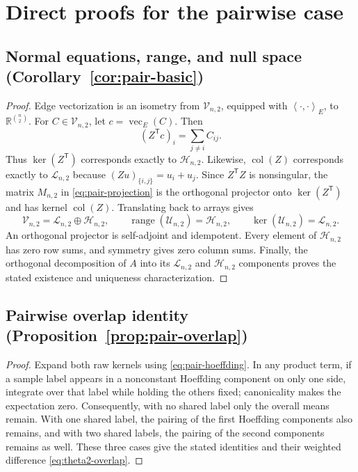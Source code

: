 \documentclass[11pt]{article}
\theoremstyle{plain}
\theoremstyle{definition}
\theoremstyle{remark}
\newcommand{\R}{\mathbb R}
\newcommand{\range}{\operatorname{range}}
\newcommand{\cU}{\mathcal U}
\newcommand{\cH}{\mathcal H}
\newcommand{\cL}{\mathcal L}
\newcommand{\cV}{\mathcal V}
\newcommand{\inner}[2]{\left\langle #1,#2\right\rangle}
\begin{document}
\section{Direct proofs for the pairwise case}
\label{app:pairwise-proofs}

\subsection{Normal equations, range, and null space
  (Corollary~\ref{cor:pair-basic})}
\label{app:proof-pair-basic}
\begin{proof}
Edge vectorization is an isometry from
$\cV_{n,2}$, equipped with $\inner{\cdot}{\cdot}_E$, to
$\R^{\binom{n}{2}}$.  For
$C\in\cV_{n,2}$, let $c=\operatorname{vec}_E(C)$.  Then
\[
 (Z^\mathsf Tc)_i=\sum_{j\ne i}C_{ij}.
\]
Thus $\ker(Z^\mathsf T)$ corresponds exactly to $\cH_{n,2}$.  Likewise,
$\operatorname{col}(Z)$ corresponds exactly to $\cL_{n,2}$ because
$(Zu)_{\{i,j\}}=u_i+u_j$.  Since $Z^\mathsf TZ$ is nonsingular, the matrix
$M_{n,2}$ in \eqref{eq:pair-projection} is the orthogonal projector onto
$\ker(Z^\mathsf T)$ and has kernel $\operatorname{col}(Z)$.  Translating back
to arrays gives
\[
 \cV_{n,2}=\cL_{n,2}\oplus\cH_{n,2},\qquad
 \range(\cU_{n,2})=\cH_{n,2},\qquad
 \ker(\cU_{n,2})=\cL_{n,2}.
\]
An orthogonal projector is self-adjoint and idempotent.  Every element of
$\cH_{n,2}$ has zero row sums, and symmetry gives zero column sums.  Finally,
the orthogonal decomposition of $A$ into its $\cL_{n,2}$ and $\cH_{n,2}$
components proves the stated existence and uniqueness characterization.
\end{proof}

\subsection{Pairwise overlap identity
  (Proposition~\ref{prop:pair-overlap})}
\label{app:proof-pair-overlap}
\begin{proof}
Expand both raw kernels using \eqref{eq:pair-hoeffding}.  In any product term,
if a sample label appears in a nonconstant Hoeffding component on only one
side, integrate over that label while holding the others fixed; canonicality
makes the expectation zero.  Consequently, with no shared label only the
overall means remain.  With one shared label, the pairing of the first
Hoeffding components also remains, and with two shared labels, the pairing of
the second components remains as well.  These three cases give the stated
identities and their weighted difference \eqref{eq:theta2-overlap}.
\end{proof}
\end{document}
